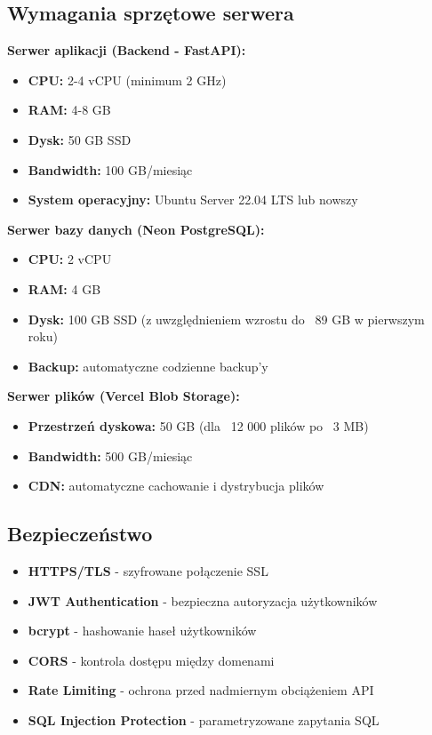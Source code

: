 \documentclass[12pt,a4paper]{article}
\begin{document}
\subsection{Wymagania sprzętowe serwera}

\textbf{Serwer aplikacji (Backend - FastAPI):}
\begin{itemize}[leftmargin=*]
    \item \textbf{CPU:} 2-4 vCPU (minimum 2 GHz)
    \item \textbf{RAM:} 4-8 GB
    \item \textbf{Dysk:} 50 GB SSD
    \item \textbf{Bandwidth:} 100 GB/miesiąc
    \item \textbf{System operacyjny:} Ubuntu Server 22.04 LTS lub nowszy
\end{itemize}

\textbf{Serwer bazy danych (Neon PostgreSQL):}
\begin{itemize}[leftmargin=*]
    \item \textbf{CPU:} 2 vCPU
    \item \textbf{RAM:} 4 GB
    \item \textbf{Dysk:} 100 GB SSD (z uwzględnieniem wzrostu do ~89 GB w pierwszym roku)
    \item \textbf{Backup:} automatyczne codzienne backup'y
\end{itemize}

\textbf{Serwer plików (Vercel Blob Storage):}
\begin{itemize}[leftmargin=*]
    \item \textbf{Przestrzeń dyskowa:} 50 GB (dla ~12 000 plików po ~3 MB)
    \item \textbf{Bandwidth:} 500 GB/miesiąc
    \item \textbf{CDN:} automatyczne cachowanie i dystrybucja plików
\end{itemize}

\subsection{Bezpieczeństwo}

\begin{itemize}[leftmargin=*]
    \item \textbf{HTTPS/TLS} - szyfrowane połączenie SSL
    \item \textbf{JWT Authentication} - bezpieczna autoryzacja użytkowników
    \item \textbf{bcrypt} - hashowanie haseł użytkowników
    \item \textbf{CORS} - kontrola dostępu między domenami
    \item \textbf{Rate Limiting} - ochrona przed nadmiernym obciążeniem API
    \item \textbf{SQL Injection Protection} - parametryzowane zapytania SQL
\end{itemize}
\end{document}
